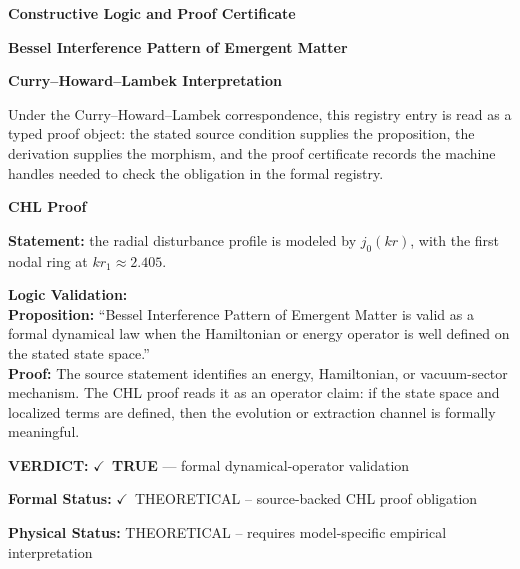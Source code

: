 \endgroup

\ifTZPDarkEdition
{}
\fi

\clearpage
\begingroup\tzpsupportsetup
\noindent\textbf{\fontsize{10.8pt}{12.8pt}\selectfont [ID 0230] Constructive Logic and Proof Certificate}\par
\noindent\textbf{\fontsize{10pt}{12pt}\selectfont Bessel Interference Pattern of Emergent Matter}\par
\vspace{0.45em}
\begingroup
\footnotesize
\setlength{\parskip}{0.22em}
\setlength{\parindent}{0pt}
\noindent\textbf{Curry--Howard--Lambek Interpretation}\par
Under the Curry--Howard--Lambek correspondence, this registry entry is read as a typed proof
object: the stated source condition supplies the proposition, the derivation supplies the
morphism, and the proof certificate records the machine handles needed to check the obligation
in the formal registry.

\vspace{0.45em}
\noindent\textbf{CHL Proof}\par
\textbf{Statement:} the radial disturbance profile is modeled by \(j_0(kr)\), with the first nodal ring at \(kr_1\approx2.405\).

\textbf{Logic Validation:}\\
\textbf{Proposition:} ``Bessel Interference Pattern of Emergent Matter is valid as a formal dynamical law when
the Hamiltonian or energy operator is well defined on the stated state space.''\\
\textbf{Proof:} The source statement identifies an energy, Hamiltonian, or vacuum-sector mechanism. The
CHL proof reads it as an operator claim: if the state space and localized terms are
defined, then the evolution or extraction channel is formally meaningful.

\textbf{VERDICT:} \ensuremath{\checkmark}\ \textbf{TRUE} --- formal dynamical-operator validation

\textbf{Formal Status:} \ensuremath{\checkmark}\ THEORETICAL -- source-backed CHL proof obligation

\textbf{Physical Status:} THEORETICAL -- requires model-specific empirical interpretation
\par\vspace{0.45em}
\par
\ifTZPDarkEdition
{}
\fi
\endgroup
\endgroup
